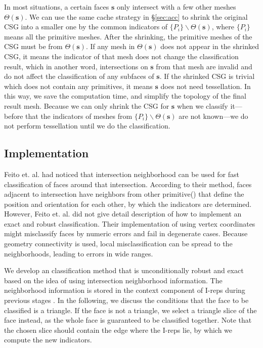 \documentclass[10pt,journal,compsoc]{IEEEtran}
\begin{document}
In most situations, a certain faces $\bm{s}$ only intersect with a few other meshes $\Theta(\bm{s})$. We can use the same cache strategy in \S\ref{sec:acc} to shrink the original CSG into a smaller one by the common indicators of $\{P_i\}\backslash\Theta(\bm{s})$, where $\{P_i\}$ means all the primitive meshes. After the shrinking, the primitive meshes of the CSG must be from $\Theta(\bm{s})$. If any mesh in $\Theta(\bm{s})$ does not appear in the shrinked CSG, it means the indicator of that mesh does not change the classification result, which in another word, intersections on $\bm{s}$ from that mesh are invalid and do not affect the classification of any subfaces of $\bm{s}$. If the shrinked CSG is trivial which does not contain any primitives, it means $\bm{s}$ does not need tessellation. In this way, we save the computation time, and simplify the topology of the final result mesh. Because we can only shrink the CSG for $\bm{s}$ when we classify it---before that the indicators of meshes from $\{P_i\}\backslash\Theta(\bm{s})$ are not known---we do not perform tessellation until we do the classification.



\subsection{Implementation}

\label{sec:individual}

Feito et. al. \cite{feito2013fast} had noticed that intersection neighborhood can be used for fast classification of faces around that intersection. According to their method, faces adjacent to intersection have neighbors from other primitive() that define the position and orientation for each other, by which the indicators are determined. However, Feito et. al. did not give detail description of how to implement an exact and robust classification. Their implementation of using vertex coordinates might misclassify faces by numeric errors and fail in degenerate cases. Because geometry connectivity is used, local misclassification can be spread to the neighborhoods, leading to errors in wide ranges.

We develop an classification method that is unconditionally robust and exact based on the idea of using intersection neighborhood information. The neighborhood information is stored in the context component of I-reps during previous stages . In the following, we discuss the conditions that the face to be classified is a triangle. If the face is not a triangle, we select a triangle slice of the face instead, as the whole face is guaranteed to be classified together. Note that the chosen slice should contain the edge where the I-reps lie, by which we compute the new indicators.
\end{document}
